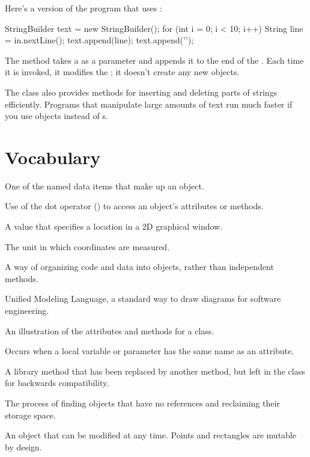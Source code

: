 Here's a version of the program that uses :

\begin{code}
StringBuilder text = new StringBuilder();
for (int i = 0; i < 10; i++) {
    String line = in.nextLine();
    text.append(line);
    text.append('\n');
}
\end{code}

The  method takes a  as a parameter and appends it to the end of the .
Each time it is invoked, it modifies the ; it doesn't create any new objects.

The  class also provides methods for inserting and deleting parts of strings efficiently.
Programs that manipulate large amounts of text run much faster if you use  objects instead of s.


\section{Vocabulary}

\begin{description}

One of the named data items that make up an object.

Use of the dot operator () to access an object's attributes or methods.

A value that specifies a location in a 2D graphical window.

The unit in which coordinates are measured.

A way of organizing code and data into objects, rather than independent methods.

Unified Modeling Language, a standard way to draw diagrams for software engineering.

An illustration of the attributes and methods for a class.

Occurs when a local variable or parameter has the same name as an attribute.

A library method that has been replaced by another method, but left in the class for backwards compatibility.

The process of finding objects that have no references and reclaiming their storage space.

An object that can be modified at any time.
Points and rectangles are mutable by design.

\end{description}


